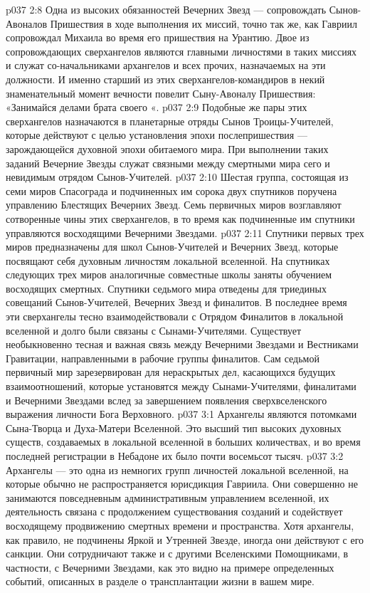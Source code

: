 \vs p037 2:8 Одна из высоких обязанностей Вечерних Звезд --- сопровождать Сынов\hyp{}Авоналов Пришествия в ходе выполнения их миссий, точно так же, как Гавриил сопровождал Михаила во время его пришествия на Урантию. Двое из сопровождающих сверхангелов являются главными личностями в таких миссиях и служат со\hyp{}начальниками архангелов и всех прочих, назначаемых на эти должности. И именно старший из этих сверхангелов\hyp{}командиров в некий знаменательный момент вечности повелит Сыну\hyp{}Авоналу Пришествия: «Занимайся делами брата своего «.
\vs p037 2:9 Подобные же пары этих сверхангелов назначаются в планетарные отряды Сынов Троицы\hyp{}Учителей, которые действуют с целью установления эпохи послепришествия --- зарождающейся духовной эпохи обитаемого мира. При выполнении таких заданий Вечерние Звезды служат связными между смертными мира сего и невидимым отрядом Сынов\hyp{}Учителей.
\vs p037 2:10 \pc {} Шестая группа, состоящая из семи миров Спасограда и подчиненных им сорока двух спутников поручена управлению Блестящих Вечерних Звезд. Семь первичных миров возглавляют сотворенные чины этих сверхангелов, в то время как подчиненные им спутники управляются восходящими Вечерними Звездами.
\vs p037 2:11 Спутники первых трех миров предназначены для школ Сынов\hyp{}Учителей и Вечерних Звезд, которые посвящают себя духовным личностям локальной вселенной. На спутниках следующих трех миров аналогичные совместные школы заняты обучением восходящих смертных. Спутники седьмого мира отведены для триединых совещаний Сынов\hyp{}Учителей, Вечерних Звезд и финалитов. В последнее время эти сверхангелы тесно взаимодействовали с Отрядом Финалитов в локальной вселенной и долго были связаны с Сынами\hyp{}Учителями. Существует необыкновенно тесная и важная связь между Вечерними Звездами и Вестниками Гравитации, направленными в рабочие группы финалитов. Сам седьмой первичный мир зарезервирован для нераскрытых дел, касающихся будущих взаимоотношений, которые установятся между Сынами\hyp{}Учителями, финалитами и Вечерними Звездами вслед за завершением появления сверхвселенского выражения личности Бога Верховного.
\vs p037 3:1 Архангелы являются потомками Сына\hyp{}Творца и Духа\hyp{}Матери Вселенной. Это высший тип высоких духовных существ, создаваемых в локальной вселенной в больших количествах, и во время последней регистрации в Небадоне их было почти восемьсот тысяч.
\vs p037 3:2 Архангелы --- это одна из немногих групп личностей локальной вселенной, на которые обычно не распространяется юрисдикция Гавриила. Они совершенно не занимаются повседневным административным управлением вселенной, их деятельность связана с продолжением существования созданий и содействует восходящему продвижению смертных времени и пространства. Хотя архангелы, как правило, не подчинены Яркой и Утренней Звезде, иногда они действуют с его санкции. Они сотрудничают также и с другими Вселенскими Помощниками, в частности, с Вечерними Звездами, как это видно на примере определенных событий, описанных в разделе о трансплантации жизни в вашем мире.
